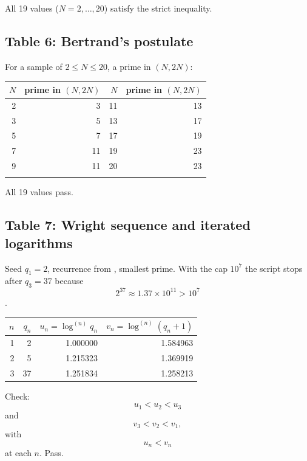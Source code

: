 \documentclass[11pt,reqno]{amsart}
\theoremstyle{redplain}
\numberwithin{equation}{section}
\begin{document}
All 19 values ($N=2,\dots,20$) satisfy the strict inequality.

\subsection{Table 6: Bertrand's postulate}

For a sample of $2\le N\le20$, a prime in $(N,2N)$:

\begin{center}
\begin{tabular}{rr|rr}
\toprule $N$ & prime in $(N,2N)$ & $N$ & prime in $(N,2N)$ \\ 
\midrule 2 & 3 & 11 & 13 \\ 
3 & 5 & 13 & 17 \\ 
5 & 7 & 17 & 19 \\ 
7 & 11 & 19 & 23 \\ 
9 & 11 & 20 & 23 \\ 
\bottomrule &  &  & 
\end{tabular}
\end{center}

All 19 values pass.

\subsection{Table 7: Wright sequence and iterated logarithms}

Seed $q_{1}=2$, recurrence from , smallest prime. With the
cap $10^{7}$ the script stops after $q_{3}=37$ because 
\begin{equation}
2^{37}\approx 1.37\times 10^{11}>10^{7}
\end{equation}%
.

\begin{center}
\begin{tabular}{rrrr}
\toprule$n$ & $q_{n}$ & $u_{n}=\log ^{(n)}q_{n}$ & $v_{n}=\log
^{(n)}(q_{n}+1)$ \\ 
\midrule1 & 2 & 1.000000 & 1.584963 \\ 
2 & 5 & 1.215323 & 1.369919 \\ 
3 & 37 & 1.251834 & 1.258213%
\end{tabular}
\end{center}

Check: 
\begin{equation*}
u_{1}<u_{2}<u_{3}
\end{equation*}
and 
\begin{equation*}
v_{3}<v_{2}<v_{1},
\end{equation*}%
with 
\begin{equation*}
u_{n}<v_{n}
\end{equation*}
at each $n$. Pass.
\end{document}
